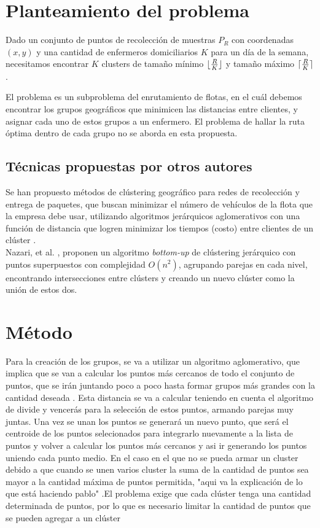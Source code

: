 \documentclass[runningheads]{llncs}
\DeclarePairedDelimiter{\ceil}{\lceil}{\rceil}
\DeclarePairedDelimiter{\floor}{\lfloor}{\rfloor}
\begin{document}
\section{Planteamiento del problema}
Dado un conjunto de puntos de recolección de muestras $P_{R}$ con coordenadas
$(x, y)$ y una cantidad de enfermeros domiciliarios $K$ para un día de la semana,
necesitamos encontrar $K$ clusters de tamaño mínimo $\floor{\frac{R}{K}}$ y tamaño
máximo $\ceil{\frac{R}{K}}$.

El problema es un subproblema del enrutamiento de flotas, en el cuál debemos encontrar
los grupos geográficos que minimicen las distancias entre clientes, y asignar cada uno
de estos grupos a un enfermero. El problema de hallar la ruta óptima dentro de cada
grupo no se aborda en esta propuesta.
\subsection{Técnicas propuestas por otros autores}
Se han propuesto métodos de clústering geográfico para redes de recolección y entrega
de paquetes, que buscan minimizar el número de vehículos de la flota que
la empresa debe usar, utilizando algoritmos jerárquicos aglomerativos con una función
de distancia que logren minimizar los tiempos (costo) entre clientes de un clúster
\cite{bard11}.
\\
Nazari, et al. \cite{nazari19}, proponen un algoritmo \textit{bottom-up} de clústering
jerárquico con puntos superpuestos con complejidad $O(n^{2})$, agrupando parejas en cada nivel,
encontrando intersecciones entre clústers y creando un nuevo clúster como la unión de estos dos.
\section{Método}
Para la creación de los grupos, se va a utilizar un algoritmo aglomerativo, que implica que se 
van a calcular los puntos más cercanos de todo el conjunto de puntos, que se irán juntando poco a poco hasta formar grupos más grandes con la cantidad deseada
. Esta distancia se va a calcular teniendo en cuenta el algoritmo de divide y vencerás para la selección
de estos puntos, armando parejas muy juntas. Una vez
se unan los puntos se generará un nuevo punto, que será el centroide de los puntos selecionados para integrarlo
nuevamente a la lista de puntos y volver a calcular los puntos más cercanos y asi ir generando los puntos uniendo
cada punto medio. En el caso en el que no se pueda armar un cluster debido a que cuando se unen varios cluster la
suma de la cantidad de puntos sea mayor a la cantidad máxima de puntos permitida, "aqui va la explicación de lo que está haciendo pablo"
.El problema exige que cada clúster tenga una cantidad determinada de puntos, por lo que es necesario
limitar la cantidad de puntos que se pueden agregar a un clúster
\end{document}
